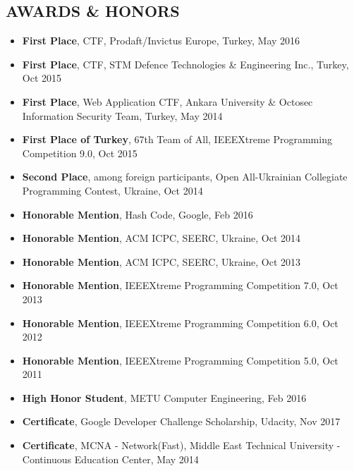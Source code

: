 \documentclass[margin, 10pt]{res} %
\begin{document}
\begin{resume}
        \section{AWARDS \& HONORS}
        \begin{itemize}
            \itemsep -2pt %
            \item {\bf First Place}, CTF, Prodaft/Invictus Europe, Turkey, May 2016
            \item {\bf First Place}, CTF, STM Defence Technologies \& Engineering Inc., Turkey, Oct 2015
            \item {\bf First Place}, Web Application CTF, Ankara University \& Octosec Information Security Team, Turkey, May 2014
            \item {\bf First Place of Turkey}, 67th Team of All, IEEEXtreme Programming Competition 9.0, Oct 2015
            \item {\bf Second Place}, among foreign participants, Open All-Ukrainian Collegiate Programming Contest, Ukraine, Oct 2014
            \item {\bf Honorable Mention}, Hash Code, Google, Feb 2016
            \item {\bf Honorable Mention}, ACM ICPC, SEERC, Ukraine, Oct 2014
            \item {\bf Honorable Mention}, ACM ICPC, SEERC, Ukraine, Oct 2013
            \item {\bf Honorable Mention}, IEEEXtreme Programming Competition 7.0, Oct 2013
            \item {\bf Honorable Mention}, IEEEXtreme Programming Competition 6.0, Oct 2012
            \item {\bf Honorable Mention}, IEEEXtreme Programming Competition 5.0, Oct 2011
            \item {\bf High Honor Student}, METU Computer Engineering, Feb 2016
            \item {\bf Certificate}, Google Developer Challenge Scholarship, Udacity, Nov 2017
            \item {\bf Certificate}, MCNA - Network(Fast), Middle East Technical University - Continuous Education Center, May 2014
        \end{itemize}





\end{resume}
\end{document}
